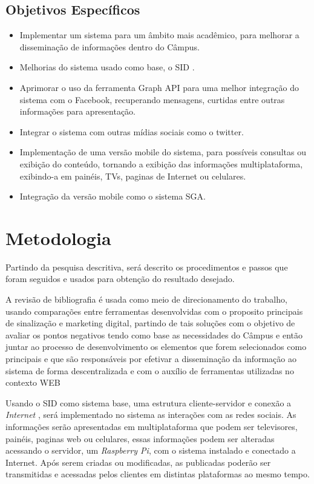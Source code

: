 

\subsection{Objetivos Específicos}
	 \begin{itemize}
	\item Implementar um sistema para um âmbito mais acadêmico, para melhorar a disseminação de informações dentro do Câmpus.
	 	
	\item Melhorias do sistema usado como base, o SID \cite{sobrinho2017}.
	
	\item Aprimorar o uso da ferramenta Graph API para uma melhor integração do sistema com o Facebook, recuperando mensagens, curtidas entre outras informações para apresentação.
	
	\item Integrar o sistema com outras mídias sociais como o twitter.
	
	\item Implementação de uma versão mobile do sistema, para possíveis consultas ou exibição do conteúdo, tornando a exibição das informações multiplataforma, exibindo-a em painéis, TVs, paginas de Internet ou celulares.
	
	\item  Integração da versão mobile como o sistema SGA.
	\end{itemize}
\section{Metodologia}
Partindo da pesquisa descritiva, será descrito os procedimentos e passos que foram seguidos e usados para obtenção do resultado desejado.
	
A revisão de bibliografia é usada como meio de direcionamento do trabalho, usando comparações entre ferramentas desenvolvidas com o proposito principais de sinalização e marketing digital, partindo de tais soluções com o objetivo de avaliar os pontos negativos tendo como base as necessidades do Câmpus e então juntar ao processo de desenvolvimento os elementos que forem selecionados como principais e que são responsáveis por efetivar a disseminação da informação ao sistema de forma descentralizada e com o auxílio de ferramentas utilizadas no contexto WEB
	 
Usando o SID como sistema base, uma estrutura cliente-servidor e conexão a \textit{Internet} , será implementado no sistema as interações com as redes sociais. As informações serão apresentadas em multiplataforma que podem ser televisores, painéis, paginas web ou celulares, essas informações podem ser alteradas acessando o servidor, um \textit{Raspberry Pi}, com o sistema instalado e conectado a Internet. Após serem criadas ou modificadas, as publicadas poderão ser transmitidas e acessadas pelos clientes em distintas plataformas ao mesmo tempo.
	
